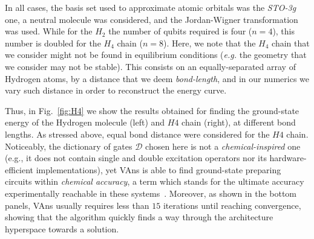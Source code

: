 In all cases, the basis set used to approximate atomic orbitals was the \textit{STO-3g} one, a neutral molecule was considered, and the Jordan-Wigner transformation was used. While for the $H_2$ the number of qubits required is four ($n=4$), this number is doubled for the $H_4$ chain ($n=8$). Here, we note that the $H_4$ chain that we consider might not be found in equilibrium conditions (\textit{e.g.} the geometry that we consider may not be stable). This consists on an equally-separated array of Hydrogen atoms, by a distance that we deem \textit{bond-length}, and in our numerics we vary such distance in order to reconstruct the energy curve.

Thus, in Fig.~\ref{fig:H4} we show the results obtained for finding the ground-state energy of the Hydrogen molecule (left) and $H4$ chain (right), at different bond lengths. As stressed above, equal bond distance were considered for the $H4$ chain. Noticeably, the dictionary of gates $\mathcal{D}$ chosen here is not a \textit{chemical-inspired} one (e.g., it does not contain single and double excitation operators nor its hardware-efficient implementations), yet VAns is able to find ground-state preparing circuits within \textit{chemical accuracy}, a term which stands for the ultimate accuracy experimentally reachable in these systems~\cite{mcardle2020quantum}. Moreover, as shown in the bottom panels, VAns usually requires less than $15$ iterations until reaching convergence, showing that the algorithm quickly finds a way through the architecture hyperspace towards a solution.


